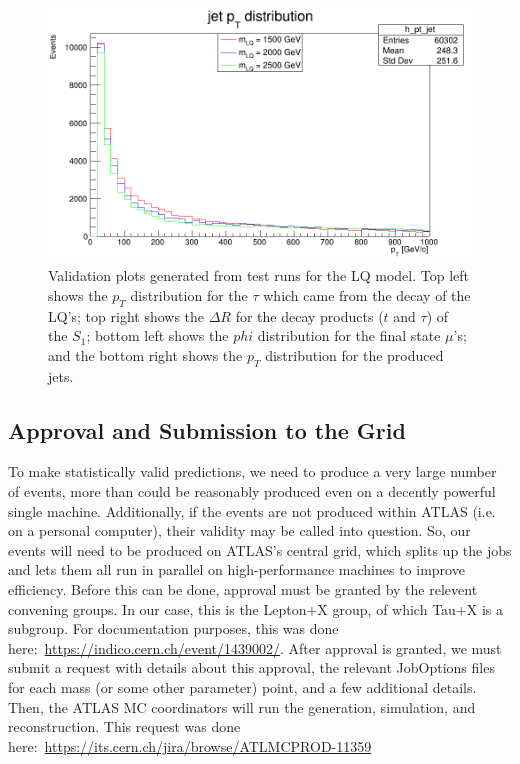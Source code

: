 \begin{figure}[hb!]
            \includegraphics[scale=0.2]{res/ValidationPlots/h_pt_jet.png}

            \caption{Validation plots generated from test runs for the LQ model. Top left shows the $p_T$ distribution for the $\tau$ which came from the decay of the LQ's; top right shows the $\Delta R$ for the decay products ($t$ and $\tau$) of the $S_1$; bottom left shows the $phi$ distribution for the final state $\mu$'s; and the bottom right shows the $p_T$ distribution for the produced jets.}
            \label{validationPlots}
        \end{figure}

    \subsection{Approval and Submission to the Grid}
        To make statistically valid predictions, we need to produce a very large number of events, more than could be reasonably produced even on a decently powerful single machine. Additionally, if the events are not produced within ATLAS (i.e. on a personal computer), their validity may be called into question. So, our events will need to be produced on ATLAS's central grid, which splits up the jobs and lets them all run in parallel on high-performance machines to improve efficiency. Before this can be done, approval must be granted by the relevent convening groups. In our case, this is the Lepton+X group, of which Tau+X is a subgroup. For documentation purposes, this was done here:~\url{https://indico.cern.ch/event/1439002/}. After approval is granted, we must submit a request with details about this approval, the relevant JobOptions files for each mass (or some other parameter) point, and a few additional details. Then, the ATLAS MC coordinators will run the generation, simulation, and reconstruction. This request was done here:~\url{https://its.cern.ch/jira/browse/ATLMCPROD-11359}

        
